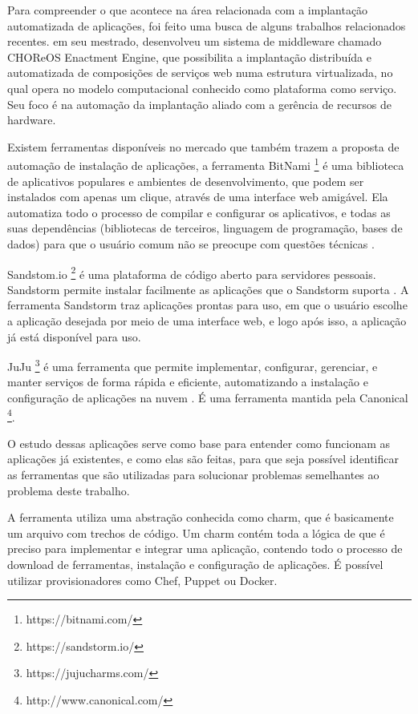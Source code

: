 Para compreender o que acontece na área relacionada com a implantação
automatizada de aplicações, foi feito uma busca de alguns trabalhos relacionados 
recentes.  em seu mestrado,
desenvolveu um sistema de middleware chamado CHOReOS Enactment Engine, que possibilita a implantação distribuída e automatizada de composições
de serviços web numa estrutura virtualizada, no qual opera no modelo
computacional conhecido como plataforma como serviço. Seu foco é na automação da 
implantação aliado com a gerência de recursos de 
hardware.

Existem ferramentas disponíveis no mercado que também trazem a proposta
de automação de instalação de aplicações, a ferramenta BitNami \footnote{https://bitnami.com/} é uma 
biblioteca de aplicativos populares e ambientes de desenvolvimento, 
que podem ser instalados com apenas um clique, 
através de uma interface web amigável. Ela automatiza todo o processo de 
compilar e configurar os aplicativos, 
e todas as suas dependências (bibliotecas de terceiros, linguagem de programação, 
bases de dados) para que o usuário comum não se preocupe com questões técnicas \cite{bitnami}. 

Sandstom.io \footnote{https://sandstorm.io/} é uma plataforma de código aberto para servidores
pessoais. Sandstorm permite instalar
facilmente as aplicações que o Sandstorm 
suporta \cite{sandstormio}. A ferramenta Sandstorm traz aplicações prontas para uso, 
em que o usuário escolhe a aplicação desejada  por meio de uma interface web, 
e logo após isso, a aplicação já está disponível para uso.

JuJu \footnote{https://jujucharms.com/} é uma ferramenta que permite 
implementar, configurar, gerenciar, 
e manter serviços de forma rápida e eficiente, automatizando a instalação e 
configuração de aplicações na nuvem \cite{juju}. É uma ferramenta mantida pela Canonical \footnote{http://www.canonical.com/}. 

O estudo dessas aplicações serve como base para entender como funcionam as aplicações
já existentes, e como elas são feitas, para que seja possível identificar
as ferramentas que são utilizadas para solucionar problemas semelhantes ao problema deste
trabalho. 

A ferramenta  utiliza uma abstração conhecida como charm,
que é basicamente um arquivo com trechos de código. Um charm
contém toda a lógica de que é preciso para implementar e integrar uma aplicação,
contendo todo o processo de download de ferramentas, instalação e configuração de
aplicações. É possível utilizar provisionadores como Chef, Puppet ou Docker. 

